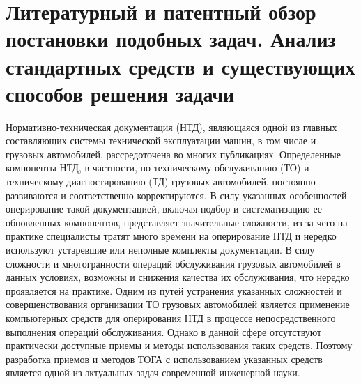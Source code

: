\documentclass[../nirs.tex]{subfiles}
\begin{document}
\section{Литературный и патентный обзор постановки подобных задач.
Анализ стандартных средств и существующих способов решения задачи}

%

Нормативно-техническая документация (НТД), являющаяся одной из главных
составляющих системы технической эксплуатации машин, в том числе и грузовых
автомобилей, рассредоточена во многих публикациях. Определенные компоненты НТД,
в частности, по техническому обслуживанию (ТО) и техническому диагностированию
(ТД) грузовых автомобилей, постоянно развиваются и соответственно корректируются.
В силу указанных особенностей оперирование такой документацией,
включая подбор и систематизацию ее обновленных компонентов, представляет
значительные сложности, из-за чего на практике специалисты тратят много времени
на оперирование НТД и нередко используют устаревшие или неполные комплекты
документации.
В силу сложности и многогранности операций обслуживания грузовых автомобилей в
данных условиях, возможны и снижения качества их обслуживания, что нередко
проявляется на практике.
Одним из путей устранения указанных сложностей и совершенствования организации ТО грузовых
автомобилей является применение компьютерных средств для оперирования НТД в процессе
непосредственного выполнения операций обслуживания. Однако в данной сфере
отсутствуют практически доступные приемы и методы использования таких средств.
Поэтому разработка приемов и методов ТОГА с использованием указанных средств
является одной из актуальных задач современной инженерной науки.
\end{document}
